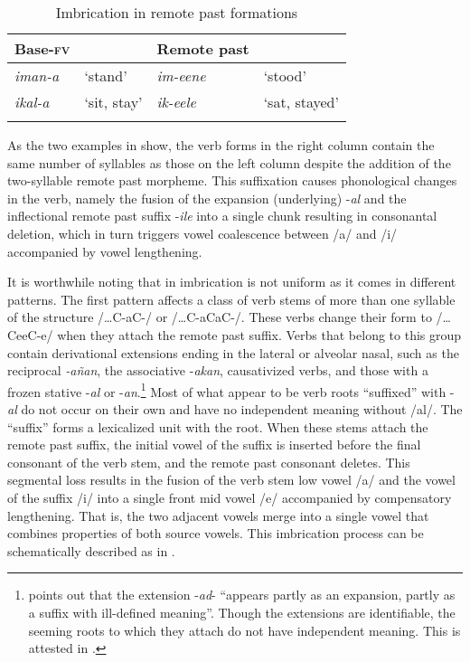 \documentclass[output=paper]{langsci/langscibook}
\begin{document}
\begin{table}
\begin{tabularx}{.75\textwidth}{XXlX}
\lsptoprule
Base-\textsc{fv} &  & Remote past & \\
\midrule
\textit{iman-a} & `stand' & \textit{im-eene} & `stood' \\
\textit{ikal-a} & `sit, stay' & \textit{ik-eele} & `sat, stayed' \\

\lspbottomrule
\end{tabularx}

\caption{Imbrication in remote past formations}
\label{tab:19.kawasha}

\end{table}

As the two examples in  show, the verb forms in the right column contain the same number of syllables as those on the left column despite the addition of the two-syllable remote past morpheme. This suffixation causes phonological changes in the verb, namely the fusion of the expansion (underlying) -\textit{al} and the inflectional remote past suffix -\textit{ile} into a single chunk resulting in consonantal deletion, which in turn triggers vowel coalescence between /a/ and /i/ accompanied by vowel lengthening. 

It is worthwhile noting that in  imbrication is not uniform as it comes in different patterns. The first pattern affects a class of verb stems of more than one syllable of the structure /…C-aC-/ or /…C-aCaC-/. These verbs change their form to /…CeeC-e/ when they attach the remote past suffix. Verbs that belong to this group contain derivational extensions ending in the lateral or alveolar nasal, such as the reciprocal \textit{-añan}, the associative -\textit{akan}, causativized verbs, and those with a frozen stative -\textit{al} or -\textit{an}.\footnote{\citet[90]{meeussen1967} points out that the extension -\textit{ad}- “appears partly as an expansion, partly as a suffix with ill-defined meaning”. Though the extensions are identifiable, the seeming roots to which they attach do not have independent meaning. This is attested in  \citep{hyman1995}.} Most of what appear to be verb roots “suffixed” with -\textit{al} do not occur on their own and have no independent meaning without /al/. The “suffix” forms a lexicalized unit with the root. When these stems attach the remote past suffix, the initial vowel of the suffix is inserted before the final consonant of the verb stem, and the remote past consonant deletes. This segmental loss results in the fusion of the verb stem low vowel /a/ and the vowel of the suffix /i/ into a single front mid vowel /e/ accompanied by compensatory lengthening. That is, the two adjacent vowels merge into a single vowel that combines properties of both source vowels. This imbrication process can be schematically described as in .
\end{document}
